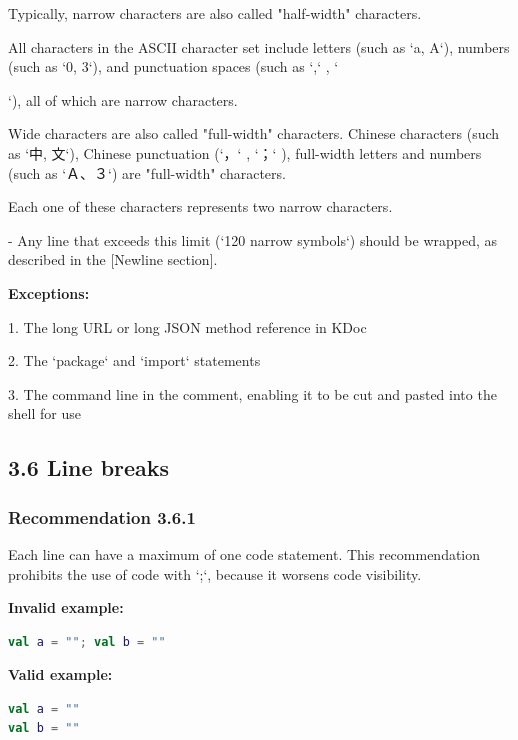 Typically, narrow characters are also called "half-width" characters.

All characters in the ASCII character set include letters (such as `a, A`), numbers (such as `0, 3`), and punctuation spaces (such as `,` , `{`), all of which are narrow characters.

Wide characters are also called "full-width" characters. Chinese characters (such as `中, 文`), Chinese punctuation (`，` , `；` ), full-width letters and numbers (such as `Ａ、３`) are "full-width" characters.

Each one of these characters represents two narrow characters.



- Any line that exceeds this limit (`120 narrow symbols`) should be wrapped, as described in the [Newline section].



\textbf{Exceptions:}



1.	The long URL or long JSON method reference in KDoc

2.	The `package` and `import` statements

3.	The command line in the comment, enabling it to be cut and pasted into the shell for use



\subsection*{\textbf{3.6 Line breaks}}

\subsubsection*{\textbf{Recommendation 3.6.1}}
\leavevmode\newline

Each line can have a maximum of one code statement. This recommendation prohibits the use of code with `;`, because it worsens code visibility.



\textbf{Invalid example:}

\begin{lstlisting}[language=Kotlin]
val a = ""; val b = ""
\end{lstlisting}


\textbf{Valid example:}

\begin{lstlisting}[language=Kotlin]
val a = ""
val b = ""
\end{lstlisting}


}
